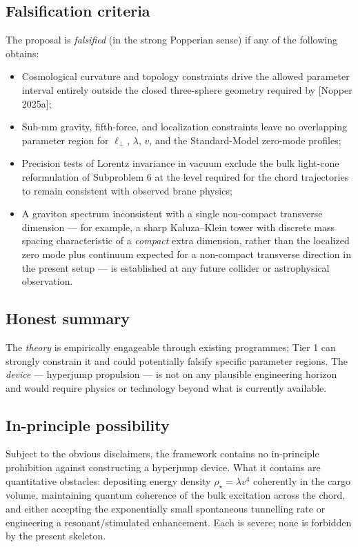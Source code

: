 \documentclass[11pt,a4paper]{article}
\begin{document}
\subsection{Falsification criteria}

The proposal is \emph{falsified} (in the strong Popperian sense) if any of the following obtains:

\begin{itemize}[leftmargin=*]
\item Cosmological curvature and topology constraints drive the allowed parameter interval entirely outside the closed three-sphere geometry required by [Nopper 2025a];
\item Sub-mm gravity, fifth-force, and localization constraints leave no overlapping parameter region for $\ell_\perp$, $\lambda$, $v$, and the Standard-Model zero-mode profiles;
\item Precision tests of Lorentz invariance in vacuum exclude the bulk light-cone reformulation of Subproblem 6 at the level required for the chord trajectories to remain consistent with observed brane physics;
\item A graviton spectrum inconsistent with a single non-compact transverse dimension --- for example, a sharp Kaluza--Klein tower with discrete mass spacing characteristic of a \emph{compact} extra dimension, rather than the localized zero mode plus continuum expected for a non-compact transverse direction in the present setup --- is established at any future collider or astrophysical observation.
\end{itemize}

\subsection{Honest summary}

The \emph{theory} is empirically engageable through existing programmes; Tier 1 can strongly constrain it and could potentially falsify specific parameter regions. The \emph{device} --- hyperjump propulsion --- is not on any plausible engineering horizon and would require physics or technology beyond what is currently available.

\subsection{In-principle possibility}

Subject to the obvious disclaimers, the framework contains no in-principle prohibition against constructing a hyperjump device. What it contains are quantitative obstacles: depositing energy density $\rho_\star=\lambda v^4$ coherently in the cargo volume, maintaining quantum coherence of the bulk excitation across the chord, and either accepting the exponentially small spontaneous tunnelling rate or engineering a resonant/stimulated enhancement. Each is severe; none is forbidden by the present skeleton.
\end{document}
